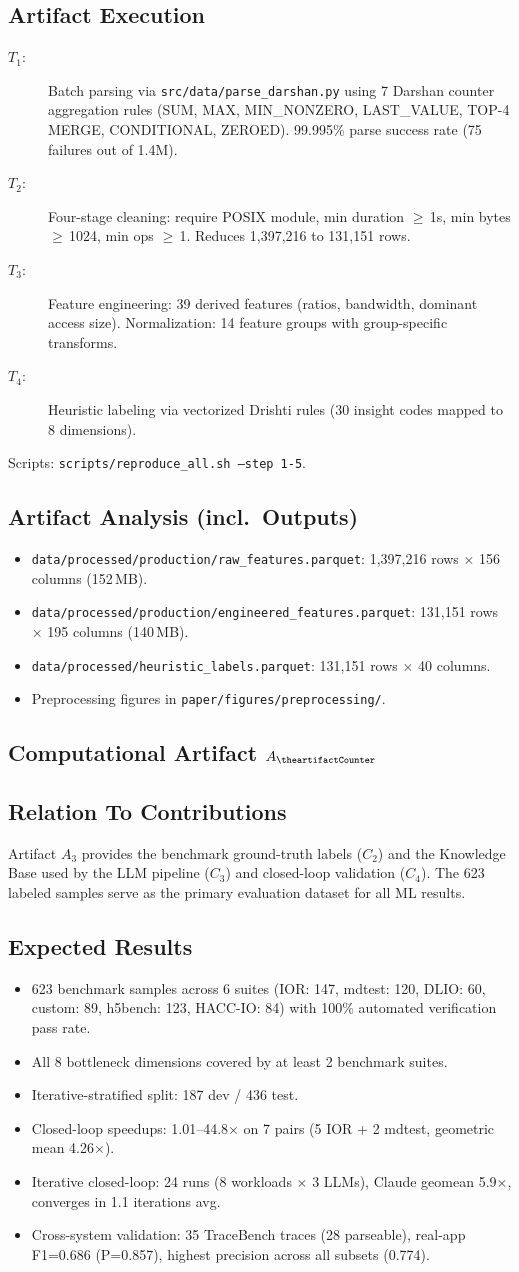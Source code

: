 \documentclass[conference]{IEEEtran}
\newcounter{artifactCounter}
\newcommand{\newartifact}{%
    \stepcounter{artifactCounter}%
    \subsection{Computational Artifact $A_{\theartifactCounter}$}%
}
\newcommand{\artrel}{\subsection*{Relation To Contributions}}
\newcommand{\artexp}{\subsection*{Expected Results}}
\newcommand{\artcomp}{\subsection*{Artifact Execution}}
\newcommand{\artout}{\subsection*{Artifact Analysis (incl.\ Outputs)}}
\begin{document}
\artcomp
\begin{description}
\item[$T_1$:] Batch parsing via \texttt{src/data/parse\_darshan.py}
using 7 Darshan counter aggregation rules (SUM, MAX, MIN\_NONZERO,
LAST\_VALUE, TOP-4 MERGE, CONDITIONAL, ZEROED).
99.995\% parse success rate (75 failures out of 1.4M).
\item[$T_2$:] Four-stage cleaning: require POSIX module, min duration
$\geq$\,1s, min bytes $\geq$\,1024, min ops $\geq$\,1. Reduces
1{,}397{,}216 to 131{,}151 rows.
\item[$T_3$:] Feature engineering: 39 derived features (ratios,
bandwidth, dominant access size). Normalization: 14 feature groups
with group-specific transforms.
\item[$T_4$:] Heuristic labeling via vectorized Drishti rules
(30 insight codes mapped to 8 dimensions).
\end{description}

Scripts: \texttt{scripts/reproduce\_all.sh --step 1-5}.

\artout
\begin{itemize}
\item \texttt{data/processed/production/raw\_features.parquet}:
1{,}397{,}216 rows $\times$ 156 columns (152\,MB).
\item \texttt{data/processed/production/engineered\_features.parquet}:
131{,}151 rows $\times$ 195 columns (140\,MB).
\item \texttt{data/processed/heuristic\_labels.parquet}:
131{,}151 rows $\times$ 40 columns.
\item Preprocessing figures in \texttt{paper/figures/preprocessing/}.
\end{itemize}

\newartifact

\artrel
Artifact $A_3$ provides the benchmark ground-truth labels ($C_2$) and
the Knowledge Base used by the LLM pipeline ($C_3$) and closed-loop
validation ($C_4$). The 623 labeled samples serve as the primary
evaluation dataset for all ML results.

\artexp
\begin{itemize}
\item 623 benchmark samples across 6 suites (IOR: 147, mdtest: 120,
DLIO: 60, custom: 89, h5bench: 123, HACC-IO: 84) with 100\%
automated verification pass rate.
\item All 8 bottleneck dimensions covered by at least 2 benchmark suites.
\item Iterative-stratified split: 187 dev / 436 test.
\item Closed-loop speedups: 1.01--44.8$\times$ on 7 pairs
(5 IOR + 2 mdtest, geometric mean 4.26$\times$).
\item Iterative closed-loop: 24 runs (8 workloads $\times$ 3 LLMs),
Claude geomean 5.9$\times$, converges in 1.1 iterations avg.
\item Cross-system validation: 35 TraceBench traces (28 parseable),
real-app F1=0.686 (P=0.857), highest precision across all subsets (0.774).
\end{itemize}
\end{document}
